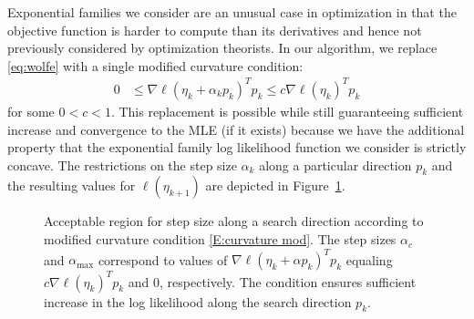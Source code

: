 Exponential families we consider are an unusual case in optimization in that the 
objective function 
is harder to compute than its derivatives and hence not previously considered by 
optimization theorists.
In our algorithm, we replace \eqref{eq:wolfe} with a single modified curvature 
condition:
\begin{align} \label{E:curvature mod}
	 0 & \leq \nabla \ell( \eta_k + \alpha_k p_k)^T p_k \leq c \nabla \ell(\eta_k)^T p_k
\end{align}
for some $0 < c < 1$.  This replacement is possible while still guaranteeing 
sufficient increase and convergence to the MLE (if it exists) 
because we have the additional property that the exponential family log likelihood 
function we consider is strictly 
concave.  The restrictions on the step size $\alpha_k$ along a particular direction 
$p_k$ and the resulting values for 
$\ell(\eta_{k+1})$ are depicted in Figure~\ref{F:alpha_region}.  

\begin{figure}[h]
\centering
    \scalebox{.4}{}
	\caption[Acceptable region for step size $\alpha$ along search 
direction $p$ according to modified curvature condition]{Acceptable region for step size 
along a search direction according to modified curvature condition 
\eqref{E:curvature mod}. The step sizes $\alpha_{c}$ and $\alpha_{\textrm{max}}$ 
correspond to values of $\nabla \ell( \eta_k + \alpha p_k)^T p_k$ equaling 
$c \nabla \ell(\eta_k)^T p_k$ and $0$, 
respectively.  The condition ensures sufficient increase in the log likelihood along 
the search direction $p_k$.}
\label{F:alpha_region}
\end{figure}
 


